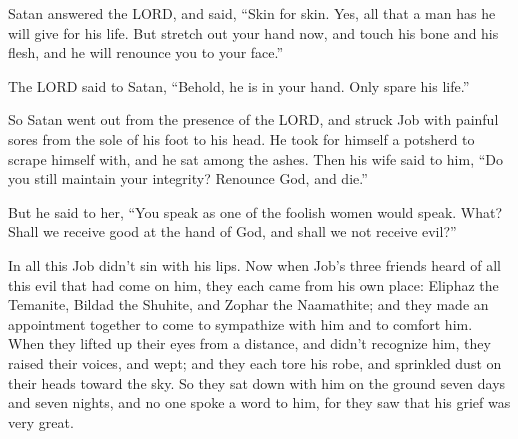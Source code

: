 \myverse{}Satan answered the LORD, and said, “Skin for skin. Yes, all that
a man has he will give for his life. \myverse{}But stretch out your hand now, and touch his bone and his flesh, and he will renounce you to your face.”


\myverse{}The LORD said to Satan, “Behold, he is in your hand. Only spare
his life.”

\myverse{}So Satan went out from the presence of the LORD, and struck Job with painful sores from the sole of his foot to his head. \myverse{}He took for himself a potsherd to scrape himself with, and he sat among the ashes. \myverse{}Then his wife said to him, “Do you still maintain your integrity? Renounce God, and die.”


\myverse{}But he said to her, “You speak as one of the foolish women would speak. What? Shall we receive good at the hand of God, and shall we not receive evil?”

In all this Job didn’t sin with his lips. \myverse{}Now when Job’s three friends heard of all this evil that had come on him, they each came from his own place: Eliphaz the Temanite, Bildad the Shuhite, and Zophar the Naamathite; and they made an appointment together to come to sympathize with him and to comfort him. \myverse{}When they lifted up their eyes from a distance, and didn’t recognize him, they raised their voices, and wept; and they each tore his robe, and sprinkled dust on their heads toward the sky. \myverse{}So they sat down with him on the ground seven days and seven nights, and no one spoke a word to him, for they saw that his grief was very great.


